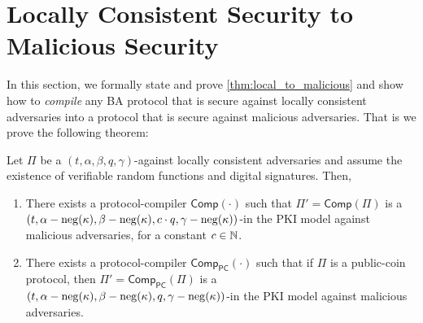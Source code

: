 \section{Locally Consistent Security to Malicious Security}\label{sec:LocalToFull}

\newcommand{\VRFGen}{\mathsf{VRF.Gen}}
\newcommand{\VRFEval}{\mathsf{VRF.Eval}}
\newcommand{\VRFVerify}{\mathsf{VRF.Verify}}
\newcommand{\Expt}{\ensuremath{\mathsf{Expt}}\xspace}
\newcommand{\ExptVRF}{\ensuremath{\Expt^\mathsf{VRF}}\xspace}
\newcommand{\Oeval}{\ensuremath{\mathcal{O}_\mathsf{eval}}\xspace}

\newcommand{\Fzk}{\ensuremath{\mathcal{F}_\mathsf{zk}}\xspace}

\newcommand{\DSGen}{\mathsf{DS.Gen}}
\newcommand{\DSSign}{\mathsf{DS.Sign}}
\newcommand{\DSVerify}{\mathsf{DS.Verify}}

\newcommand{\dssk}{\mathsf{sk}^{\mathsf{ds}}}
\newcommand{\dsvk}{\mathsf{vk}^{\mathsf{ds}}}
\newcommand{\vrfsk}{\mathsf{sk}^{\mathsf{vrf}}}
\newcommand{\vrfvk}{\mathsf{vk}^{\mathsf{vrf}}}

\newcommand{\setup}{\mathsf{setup}}
\newcommand{\comp}{\mathsf{Comp}}
\newcommand{\comppc}{\comp_\mathsf{PC}}



In this section, we formally state and prove \cref{thm:local_to_malicious} and show how to \emph{compile} any BA protocol that is secure against locally consistent adversaries into a protocol that is secure against malicious adversaries.
That is we prove the following theorem:

\begin{theorem}\label{thm:local_to_malicious:Res}
Let $\Pi$ be a $(t,\alpha,\beta,q,\gamma)$-\BA against locally consistent adversaries and assume the existence of verifiable random functions and digital signatures.
Then, 
\begin{enumerate}
    \item
    There exists a \ppt protocol-compiler $\comp(\cdot)$ such that $\Pi'=\comp(\Pi)$ is a $(t,\alpha-\operatorname{neg}(\kappa),\beta-\operatorname{neg}(\kappa),c\cdot q,\gamma-\operatorname{neg}(\kappa))$-\BA in the PKI model against malicious adversaries, for a constant $c\in{\mathbb{N}}$.
    \item
    There exists a \ppt protocol-compiler $\comppc(\cdot)$ such that if $\Pi$ is a public-coin protocol, then $\Pi'=\comppc(\Pi)$ is a $(t,\alpha-\operatorname{neg}(\kappa),\beta-\operatorname{neg}(\kappa),q,\gamma-\operatorname{neg}(\kappa))$-\BA in the PKI model against malicious adversaries.
\end{enumerate}
\end{theorem}


